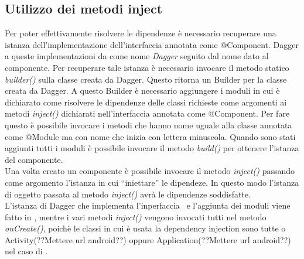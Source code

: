 \documentclass[../ManualeSviluppatore.tex]{subfiles}
\begin{document}
	\subsection{Utilizzo dei metodi inject}
	Per poter effettivamente risolvere le dipendenze è necessario recuperare una istanza dell'implementazione dell'interfaccia annotata come @Component. Dagger a queste implementazioni da come nome \textit{Dagger} seguito dal nome dato al componente. Per recuperare tale istanza è necessario invocare il metodo statico \textit{builder()} sulla classe creata da Dagger. Questo ritorna un Builder per la classe creata da Dagger. A questo Builder è necessario aggiungere i moduli in cui è dichiarato come risolvere le dipendenze delle classi richieste come argomenti ai metodi \textit{inject()} dichiarati nell'interfaccia annotata come @Component. Per fare questo è possibile invocare i metodi che hanno nome uguale alla classe annotata come @Module ma con nome che inizia con lettera minuscola. Quando sono stati aggiunti tutti i moduli è possibile invocare il metodo \textit{build()} per ottenere l'istanza del componente.\\
	Una volta creato un componente è possibile invocare il metodo \textit{inject()} passando come argomento l'istanza in cui ``iniettare'' le dipendeze.
	In questo modo l'istanza di oggetto passata al metodo \textit{inject()} avrà le dipendenze soddisfatte.\\
	L'istanza di Dagger che implementa l'inperfaccia \InfoComponent\ e l'aggiunta dei moduli viene fatto in \MyApplication, mentre i vari metodi \textit{inject()} vengono invocati tutti nel metodo \textit{onCreate()}, poichè le classi in cui è usata la dependency injection sono tutte o Activity(??Mettere url android??) oppure Application(??Mettere url android??) nel caso di \MyApplication.
\end{document}
